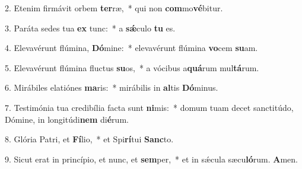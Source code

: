 2. Etenim firmávit orbem \textbf{ter}ræ,~*  qui non \textbf{com}mo\textbf{vé}bitur.\

3. Paráta sedes tua \textbf{ex} tunc:~*  a \textbf{sǽ}culo \textbf{tu} es.\

4. Elevavérunt flúmina, \textbf{Dó}mine:~*  elevavérunt flúmina \textbf{vo}cem \textbf{su}am.\

5. Elevavérunt flúmina fluctus \textbf{su}os,~*  a vócibus a\textbf{quá}rum mul\textbf{tá}rum.\

6. Mirábiles elatiónes \textbf{ma}ris:~*  mirábilis in \textbf{al}tis \textbf{Dó}minus.\

7. Testimónia tua credibília facta sunt \textbf{ni}mis:~*  domum tuam decet sanctitúdo, Dómine, in longitúdi\textbf{nem} di\textbf{é}rum.\

8. Glória Patri, et \textbf{Fí}lio,~*  et Spi\textbf{rí}tui \textbf{Sanc}to.\

9. Sicut erat in princípio, et nunc, et \textbf{sem}per,~*  et in sǽcula sæcu\textbf{ló}rum. \textbf{A}men.\


